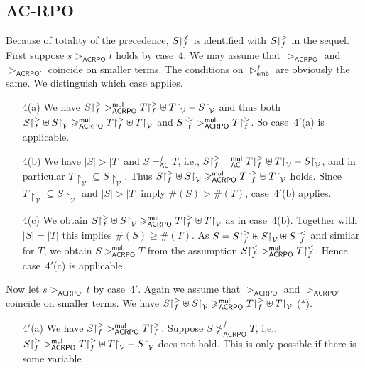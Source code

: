 \documentclass{tlp}
\newcommand{\embsm}[1]{\vartriangleright^{\!#1}_{\!\mathsf{emb}}}
\newcommand{\m}[1]{\mathsf{#1}}
\newcommand{\mc}[1]{\mathcal{#1}}
\newcommand{\mr}[1]{\mathrm{#1}}
\newcommand{\mul}{\m{mul}}
\newcommand{\VV}{\mc{V}}
\newcommand{\AC}{\mr{\m{AC}}}
\newcommand{\acrpo}{\mr{\m{ACRPO}}}
\newcommand{\acrpoo}{\mr{\m{ACRPO'}}}
\newcommand{\rrs}[3][f]{{#2}{\restriction}^{\smash{#3}}_{#1}}
\begin{document}
\subsection{AC-RPO}

\begin{proof*}
Because of totality of the precedence, $\rrs{S}{\not <}$ is
identified with $\rrs{S}{>}$ in the sequel.
First suppose $s >_\acrpo t$ holds by case~4.
We may assume that $>_\acrpo$ and $>_\acrpoo$ coincide on smaller
terms.
The conditions on $\embsm{f}$ are obviously the same. We distinguish
which case applies.
\begin{enumerate} 
\item[4(a)]
We have 
$\rrs{S}{>} >_\acrpo^\mul \rrs{T}{>} \uplus T{\restriction}_\VV -
S{\restriction}_\VV$ and thus both
$\rrs{S}{>} \uplus S{\restriction}_\VV \geqslant_\acrpo^\mul 
\rrs{T}{>} \uplus T{\restriction}_\VV$ and
$\rrs{S}{>} >_\acrpo^\mul \rrs{T}{>}$. So case~4$'$(a) is applicable.
\smallskip
\item[4(b)]
We have $|S| > |T|$ and $S =_\AC^f T$, i.e.,
$\rrs{S}{>} =_\AC^\mul \rrs{T}{>} \uplus T{\restriction}_\VV -
S{\restriction}_\VV$, and in particular 
$T{\restriction}_\VV \subseteq S{\restriction}_\VV$. Thus 
$\rrs{S}{>} \uplus S{\restriction}_\VV \geqslant_\acrpo^\mul 
\rrs{T}{>} \uplus T{\restriction}_\VV$ holds. 
Since $T{\restriction}_\VV \subseteq S{\restriction}_\VV$ and
$|S| > |T|$ imply $\#(S) > \#(T)$, case~4$'$(b) applies.
\smallskip
\item[4(c)]
We obtain $\rrs{S}{>} \uplus S{\restriction}_\VV \geqslant_\acrpo^\mul 
\rrs{T}{>} \uplus T{\restriction}_\VV$ as in case~4(b).
Together with $|S| = |T|$ this implies $\#(S) \geqslant \#(T)$.
As $S = \rrs{S}{>} \uplus S{\restriction}_\VV \uplus \rrs{S}{<}$
and similar for $T$, we obtain $S >_\acrpo^\mul T$ from the
assumption $\rrs{S}{<} >_\acrpo^\mul \rrs{T}{<}$. Hence case~4$'$(c)
is applicable.
\end{enumerate} 
Now let $s >_\acrpoo t$ by case~4$'$.
Again we assume that $>_\acrpo$ and $>_\acrpoo$ coincide on smaller
terms. We have
$\rrs{S}{>} \uplus S{\restriction}_\VV \geqslant_\acrpo^\mul 
\rrs{T}{>} \uplus T{\restriction}_\VV$ ($\ast$).
\begin{enumerate} 
\item[4$'$(a)]
We have $\rrs{S}{>} >_\acrpo^\mul \rrs{T}{>}$. 
Suppose  $S \not >_\acrpo^f T$, i.e., 
$\rrs{S}{>} >_\acrpo^\mul \rrs{T}{>} \uplus T{\restriction}_\VV -
S{\restriction}_\VV$ does not hold.
This is only possible if there is some variable

\end{enumerate}
\end{proof*}
\end{document}
